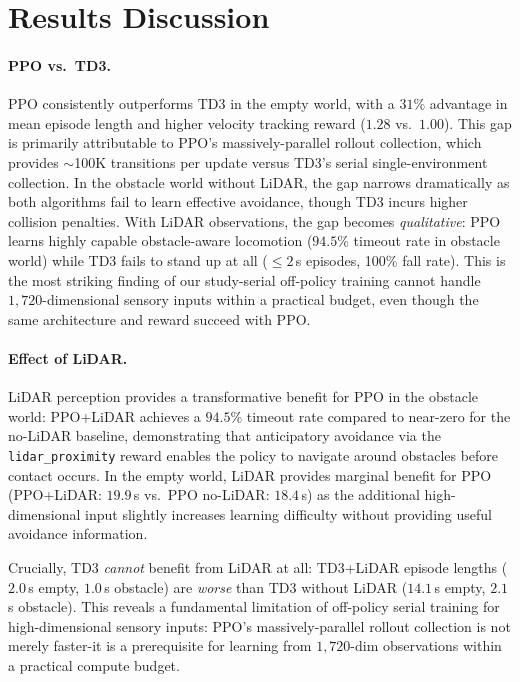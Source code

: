 \documentclass{article}
\begin{document}
\section{Results Discussion}

\paragraph{PPO vs.\ TD3.}
PPO consistently outperforms TD3 in the empty world, with a $31\%$ advantage
in mean episode length and higher velocity tracking reward ($1.28$ vs.\
$1.00$). This gap is primarily attributable to PPO's massively-parallel
rollout collection, which provides $\sim$100K transitions per update versus
TD3's serial single-environment collection.
In the obstacle world without LiDAR, the gap narrows dramatically as both
algorithms fail to learn effective avoidance, though TD3 incurs higher
collision penalties.
With LiDAR observations, the gap becomes \emph{qualitative}: PPO learns
highly capable obstacle-aware locomotion ($94.5\%$ timeout rate in obstacle
world) while TD3 fails to stand up at all ($\leq 2$\,s episodes, 100\%
fall rate). This is the most striking finding of our study-serial off-policy
training cannot handle $1{,}720$-dimensional sensory inputs within a
practical budget, even though the same architecture and reward succeed
with PPO.

\paragraph{Effect of LiDAR.}
LiDAR perception provides a transformative benefit for PPO in the obstacle
world: PPO+LiDAR achieves a $94.5\%$ timeout rate compared to near-zero for
the no-LiDAR baseline, demonstrating that anticipatory avoidance via the
\texttt{lidar\_proximity} reward enables the policy to navigate around
obstacles before contact occurs.
In the empty world, LiDAR provides marginal benefit for PPO
(PPO+LiDAR: $19.9$\,s vs.\ PPO no-LiDAR: $18.4$\,s) as the additional
high-dimensional input slightly increases learning difficulty without
providing useful avoidance information.

Crucially, TD3 \emph{cannot} benefit from LiDAR at all: TD3+LiDAR episode
lengths ($2.0$\,s empty, $1.0$\,s obstacle) are \emph{worse} than TD3
without LiDAR ($14.1$\,s empty, $2.1$\,s obstacle).
This reveals a fundamental limitation of off-policy serial training for
high-dimensional sensory inputs: PPO's massively-parallel rollout collection
is not merely faster-it is a prerequisite for learning from $1{,}720$-dim
observations within a practical compute budget.
\end{document}
